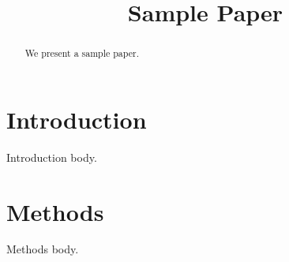 \documentclass{article}
\begin{document}
\title{Sample Paper}
\begin{abstract}
We present a sample paper.
\end{abstract}
\section{Introduction}
Introduction body.
\section{Methods}
Methods body.

\end{document}
